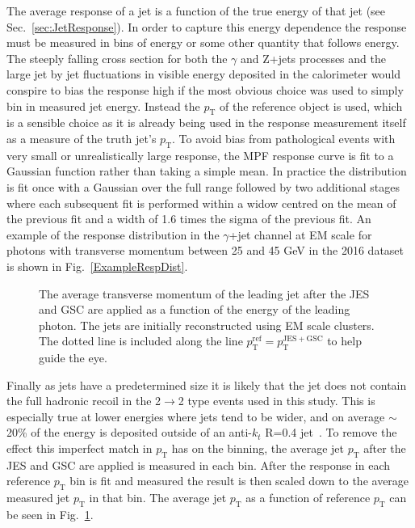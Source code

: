 The average response of a jet is a function of the true energy of that jet (see Sec.~\ref{sec:JetResponse}).  
In order to capture this energy dependence the response must be measured in bins of energy or some other quantity that follows energy.  
The steeply falling cross section for both the $\gamma$ and Z+jets processes and the large jet by jet fluctuations in visible energy deposited in the calorimeter would conspire to bias the response high if the most obvious choice was used to simply bin in measured jet energy.  
Instead the $p_{\mathrm T}$ of the reference object is used, which is a sensible choice as it is already being used in the response measurement itself as a measure of the truth jet's $p_{\mathrm T}$.  
To avoid bias from pathological events with very small or unrealistically large response, the MPF response curve is fit to a Gaussian function rather than taking a simple mean.  
In practice the distribution is fit once with a Gaussian over the full range followed by two additional stages where each subsequent fit is performed within a widow centred on the mean of the previous fit and a width of 1.6 times the sigma of the previous fit.  
An example of the response distribution in the $\gamma$+jet channel at EM scale for photons with transverse momentum between 25 and 45 GeV in the 2016 dataset is shown in Fig.~\ref{ExampleRespDist}.  

\begin{figure}[!ht]
\begin{center}
\end{center}
\caption[Average measured jet momentum Vs. refence $p_{\mathrm T}$]
{\small The average transverse momentum of the leading jet after the JES and GSC are applied as a function of the energy of the leading photon.  The jets are initially reconstructed using EM scale clusters.  The dotted line is included along the line $p_{\mathrm T}^{\mathrm {ref}}=p_{\mathrm T}^{\mathrm{JES+GSC}}$ to help guide the eye.}
\label{plot:MappingExample}
\end{figure}


Finally as jets have a predetermined size it is likely that the jet does not contain the full hadronic recoil in the 2$\rightarrow$2 type events used in this study.  
This is especially true at lower energies where jets tend to be wider, and on average $\sim$20\% of the energy is deposited outside of an anti-$k_t$ R=0.4 jet~\cite{ATLAS-CONF-2015-057}.  
To remove the effect this imperfect match in $p_{\mathrm T}$ has on the binning, the average jet $p_{\mathrm T}$ after the JES and GSC are applied is measured in each bin.  
After the response in each reference $p_{\mathrm T}$ bin is fit and measured the result is then scaled down to the average measured jet $p_{\mathrm T}$ in that bin.  
The average jet $p_{\mathrm T}$ as a function of reference $p_{\mathrm T}$ can be seen in Fig.~\ref{plot:MappingExample}.  

